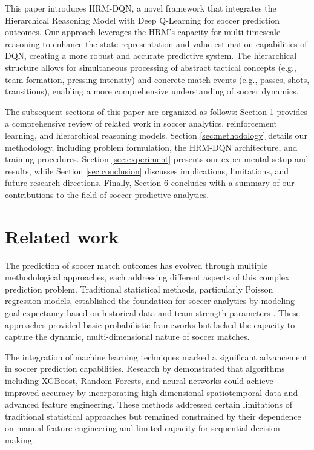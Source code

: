 \documentclass[3p,times,procedia]{elsarticle}
\begin{document}
This paper introduces HRM-DQN, a novel framework that integrates the Hierarchical Reasoning Model with Deep Q-Learning for soccer prediction outcomes. Our approach leverages the HRM's capacity for multi-timescale reasoning to enhance the state representation and value estimation capabilities of DQN, creating a more robust and accurate predictive system. The hierarchical structure allows for simultaneous processing of abstract tactical concepts (e.g., team formation, pressing intensity) and concrete match events (e.g., passes, shots, transitions), enabling a more comprehensive understanding of soccer dynamics.

The subsequent sections of this paper are organized as follows: Section \ref{sec:related} provides a comprehensive review of related work in soccer analytics, reinforcement learning, and hierarchical reasoning models. Section \ref{sec:methodology} details our methodology, including problem formulation, the HRM-DQN architecture, and training procedures. Section \ref{sec:experiment} presents our experimental setup and results, while Section \ref{sec:conclusion} discusses implications, limitations, and future research directions. Finally, Section 6 concludes with a summary of our contributions to the field of soccer predictive analytics.

\section{Related work} \label{sec:related}

The prediction of soccer match outcomes has evolved through multiple methodological approaches, each addressing different aspects of this complex prediction problem. Traditional statistical methods, particularly Poisson regression models, established the foundation for soccer analytics by modeling goal expectancy based on historical data and team strength parameters \cite{dixon1997modelling}. These approaches provided basic probabilistic frameworks but lacked the capacity to capture the dynamic, multi-dimensional nature of soccer matches.

The integration of machine learning techniques marked a significant advancement in soccer prediction capabilities. Research by \cite{leckey2025machine} demonstrated that algorithms including XGBoost, Random Forests, and neural networks could achieve improved accuracy by incorporating high-dimensional spatiotemporal data and advanced feature engineering. These methods addressed certain limitations of traditional statistical approaches but remained constrained by their dependence on manual feature engineering and limited capacity for sequential decision-making.
\end{document}

